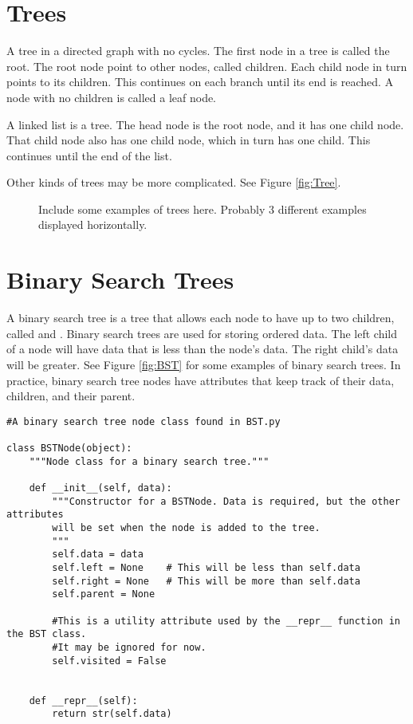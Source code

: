 \section*{Trees}

A tree in a directed graph with no cycles.
The first node in a tree is called the root.
The root node point to other nodes, called children.
Each child node in turn points to its children.
This continues on each branch until its end is reached.
A node with no children is called a leaf node.

A linked list is a tree.
The head node is the root node, and it has one child node.
That child node also has one child node, which in turn has one child.
This continues until the end of the list.

Other kinds of trees may be more complicated.
See Figure \ref{fig:Tree}.

\begin{figure}
\caption{Include some examples of trees here.  Probably 3 different examples displayed horizontally.}
\end{figure}

\section*{Binary Search Trees}

A binary search tree is a tree that allows each node to have up to two children, called  and .
Binary search trees are used for storing ordered data.
The left child of a node will have data that is less than the node's data.
The right child's data will be greater.
See Figure \ref{fig:BST} for some examples of binary search trees.
In practice, binary search tree nodes have attributes that keep track of their data, children, and their parent.

\begin{lstlisting}
#A binary search tree node class found in BST.py

class BSTNode(object):
	"""Node class for a binary search tree."""

	def __init__(self, data):
		"""Constructor for a BSTNode. Data is required, but the other attributes
		will be set when the node is added to the tree.
		"""
		self.data = data
		self.left = None 	# This will be less than self.data
		self.right = None 	# This will be more than self.data
		self.parent = None
		
		#This is a utility attribute used by the __repr__ function in the BST class.
		#It may be ignored for now.
		self.visited = False


	def __repr__(self):
		return str(self.data)
\end{lstlisting}

